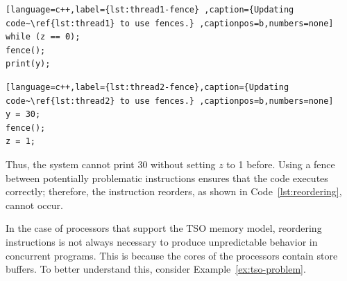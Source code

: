 \begin{example}
\begin{lstlisting}[language=c++,label={lst:thread1-fence} ,caption={Updating code~\ref{lst:thread1} to use fences.} ,captionpos=b,numbers=none]
while (z == 0);
fence();
print(y);
\end{lstlisting}

\begin{lstlisting}[language=c++,label={lst:thread2-fence},caption={Updating code~\ref{lst:thread2} to use fences.} ,captionpos=b,numbers=none]
y = 30;
fence();
z = 1;
\end{lstlisting}

Thus, the system cannot print 30 without setting \(z\) to 1 before. Using a fence between potentially problematic instructions ensures that the code executes correctly; therefore, the instruction reorders, as shown in Code~\ref{lst:reordering}, cannot occur.
\end{example}


In the case of processors that support the TSO memory model, reordering instructions is not always necessary to produce unpredictable behavior in concurrent programs. This is because the cores of the processors contain store buffers. To better understand this, consider Example~\ref{ex:tso-problem}.

